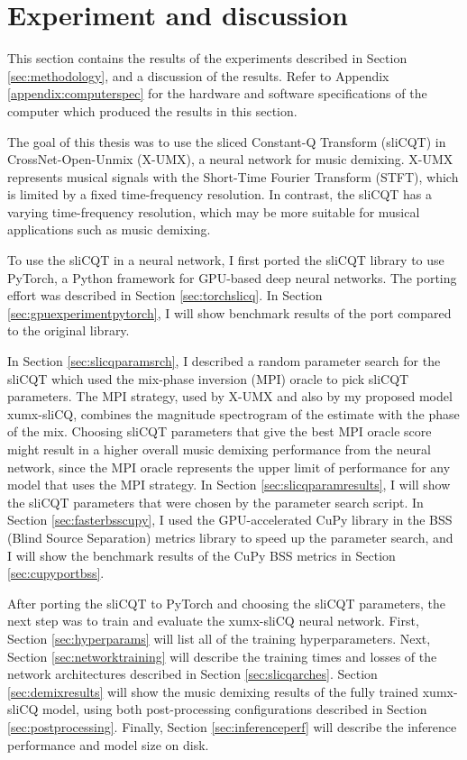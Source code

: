 \documentclass[report.tex]{subfiles}
\begin{document}
\section{Experiment and discussion}
\label{sec:experiment}

This section contains the results of the experiments described in Section \ref{sec:methodology}, and a discussion of the results. Refer to Appendix \ref{appendix:computerspec} for the hardware and software specifications of the computer which produced the results in this section.

The goal of this thesis was to use the sliced Constant-Q Transform (sliCQT) in CrossNet-Open-Unmix (X-UMX), a neural network for music demixing. X-UMX represents musical signals with the Short-Time Fourier Transform (STFT), which is limited by a fixed time-frequency resolution. In contrast, the sliCQT has a varying time-frequency resolution, which may be more suitable for musical applications such as music demixing.

To use the sliCQT in a neural network, I first ported the sliCQT library to use PyTorch, a Python framework for GPU-based deep neural networks. The porting effort was described in Section \ref{sec:torchslicq}. In Section \ref{sec:gpuexperimentpytorch}, I will show benchmark results of the port compared to the original library.

In Section \ref{sec:slicqparamsrch}, I described a random parameter search for the sliCQT which used the mix-phase inversion (MPI) oracle to pick sliCQT parameters. The MPI strategy, used by X-UMX and also by my proposed model xumx-sliCQ, combines the magnitude spectrogram of the estimate with the phase of the mix. Choosing sliCQT parameters that give the best MPI oracle score might result in a higher overall music demixing performance from the neural network, since the MPI oracle represents the upper limit of performance for any model that uses the MPI strategy. In Section \ref{sec:slicqparamresults}, I will show the sliCQT parameters that were chosen by the parameter search script. In Section \ref{sec:fasterbsscupy}, I used the GPU-accelerated CuPy library in the BSS (Blind Source Separation) metrics library to speed up the parameter search, and I will show the benchmark results of the CuPy BSS metrics in Section \ref{sec:cupyportbss}.

After porting the sliCQT to PyTorch and choosing the sliCQT parameters, the next step was to train and evaluate the xumx-sliCQ neural network. First, Section \ref{sec:hyperparams} will list all of the training hyperparameters. Next, Section \ref{sec:networktraining} will describe the training times and losses of the network architectures described in Section \ref{sec:slicqarches}. Section \ref{sec:demixresults} will show the music demixing results of the fully trained xumx-sliCQ model, using both post-processing configurations described in Section \ref{sec:postprocessing}. Finally, Section \ref{sec:inferenceperf} will describe the inference performance and model size on disk.
\end{document}
